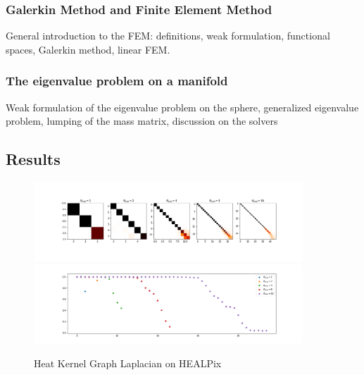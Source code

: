 \subsubsection{Galerkin Method and Finite Element Method}
General introduction to the FEM: definitions, weak formulation, functional spaces, Galerkin method, linear FEM.
\subsubsection{The eigenvalue problem on a manifold}
Weak formulation of the eigenvalue problem on the sphere, generalized eigenvalue problem, lumping of the mass matrix, discussion on the solvers
\subsection{Results}
\label{sec:Chapter3: Results}
\begin{figure}[h]
	\label{fig:HeatKernelGraphLaplacianHealpix}
	\caption{Heat Kernel Graph Laplacian on HEALPix}
	\centering
	\includegraphics[width=0.9\textwidth]{../codes/02.HeatKernelGraphLaplacian/HEALPix/06_figures/optimal_thresholded.png}
	\includegraphics[width=0.9\textwidth]{../codes/02.HeatKernelGraphLaplacian/HEALPix/06_figures/optimal_thresholded_diagonal.png}	
\end{figure}

